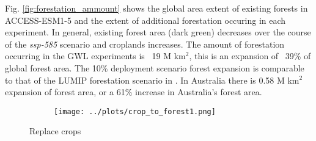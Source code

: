 \documentclass[]{article}
\begin{document}
Fig. \ref{fig:forestation_ammount} shows the global area extent of existing forests in ACCESS-ESM1-5 and the extent of additional forestation occuring in each experiment.
In general, existing forest area (dark green) decreases over the course of the \textit{ssp-585} scenario and croplands increases.
The amount of forestation occurring in the GWL experiments is ~19 M km$^2$, this is an expansion of ~39\% of global forest area.
The 10\% deployment scenario forest expansion is comparable to that of the LUMIP forestation scenario in \cite{loughran_limited_2023}.
In Australia there is 0.58 M km$^2$ expansion of forest area, or a 61\% increase in Australia's forest area.

\begin{figure}[H]
    \begin{subfigure}[b]{\linewidth}
        \centering
        \texttt{[image: ../plots/crop\_to\_forest1.png]}
    \end{subfigure}
    \caption{Replace crops}
    \label{fig:to_forest}
\end{figure}
\end{document}
